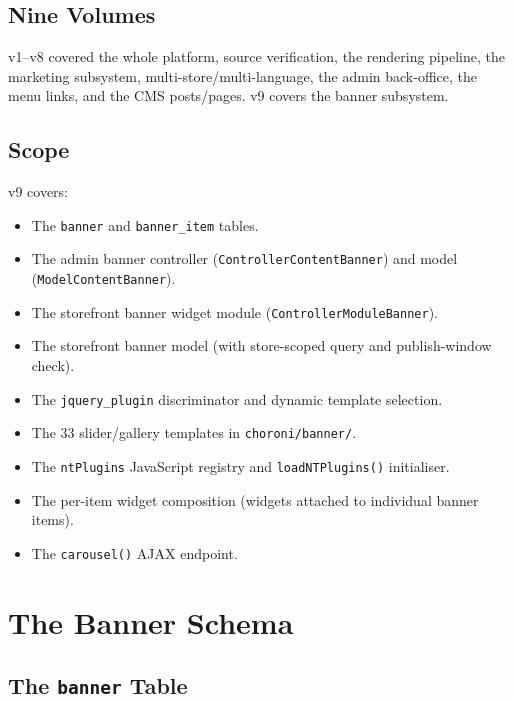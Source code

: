 \documentclass[11pt,a4paper]{article}
\begin{document}
\subsection{Nine Volumes}

v1--v8 covered the whole platform, source verification, the rendering
pipeline, the marketing subsystem, multi-store/multi-language, the
admin back-office, the menu links, and the CMS posts/pages. v9 covers
the banner subsystem.

\subsection{Scope}

v9 covers:
\begin{itemize}[leftmargin=1.6em,itemsep=2pt]
  \item The \texttt{banner} and \texttt{banner\_item} tables.
  \item The admin banner controller (\texttt{ControllerContentBanner})
        and model (\texttt{ModelContentBanner}).
  \item The storefront banner widget module
        (\texttt{ControllerModuleBanner}).
  \item The storefront banner model (with store-scoped query and
        publish-window check).
  \item The \texttt{jquery\_plugin} discriminator and dynamic template
        selection.
  \item The 33 slider/gallery templates in
        \texttt{choroni/banner/}.
  \item The \texttt{ntPlugins} JavaScript registry and
        \texttt{loadNTPlugins()} initialiser.
  \item The per-item widget composition (widgets attached to
        individual banner items).
  \item The \texttt{carousel()} AJAX endpoint.
\end{itemize}

\section{The Banner Schema}\label{sec:schema}

\subsection{The \texttt{banner} Table}
\end{document}
